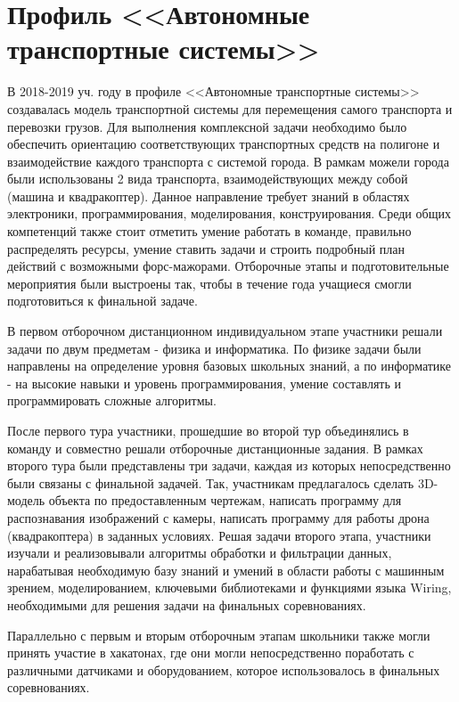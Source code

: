 

\chapter{Профиль <<Автономные транспортные системы>>}

В 2018-2019 уч. году в профиле <<Автономные транспортные системы>> создавалась модель транспортной системы для перемещения самого транспорта и перевозки грузов. Для выполнения комплексной задачи необходимо было обеспечить ориентацию соответствующих транспортных средств на полигоне и взаимодействие каждого транспорта с системой города. В рамкам можели города были использованы 2 вида транспорта, взаимодействующих между собой (машина и квадракоптер). Данное направление требует знаний в областях электроники, программирования, моделирования, конструирования. Среди общих компетенций также стоит отметить умение работать в команде, правильно распределять ресурсы, умение ставить задачи и строить подробный план действий с возможными форс-мажорами. Отборочные этапы и подготовительные мероприятия были выстроены так, чтобы в течение года учащиеся смогли подготовиться к финальной задаче. 

В первом отборочном дистанционном индивидуальном этапе участники решали задачи по двум предметам - физика и информатика. По физике задачи были направлены на определение уровня базовых школьных знаний, а по информатике - на высокие навыки и уровень программирования, умение составлять и программировать сложные алгоритмы.

После первого тура участники, прошедшие во второй тур объединялись в команду и совместно решали отборочные дистанционные задания. В рамках второго тура были представлены три задачи, каждая из которых непосредственно были связаны с финальной задачей. Так, участникам предлагалось сделать 3D-модель объекта по предоставленным чертежам, написать программу для распознавания изображений с камеры, написать программу для работы дрона (квадракоптера) в заданных условиях. Решая задачи второго этапа, участники изучали и реализовывали алгоритмы обработки и фильтрации данных, нарабатывая необходимую базу знаний и умений в области работы с машинным зрением, моделированием, ключевыми библиотеками и функциями языка Wiring, необходимыми для решения задачи на финальных соревнованиях.

Параллельно с первым и вторым отборочным этапам школьники также могли принять участие в хакатонах, где они могли непосредственно поработать с различными датчиками и оборудованием, которое использовалось в финальных соревнованиях.

